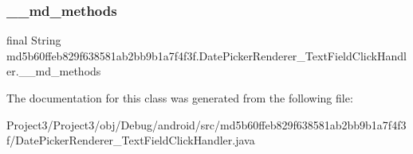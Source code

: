 \subsubsection{\texorpdfstring{\+\_\+\+\_\+md\+\_\+methods}{\_\_md\_methods}}
{\footnotesize\ttfamily final String md5b60ffeb829f638581ab2bb9b1a7f4f3f.\+Date\+Picker\+Renderer\+\_\+\+Text\+Field\+Click\+Handler.\+\_\+\+\_\+md\+\_\+methods\hspace{0.3cm}{\ttfamily [static]}}



The documentation for this class was generated from the following file\+:\begin{DoxyCompactItemize}
\item 
Project3/\+Project3/obj/\+Debug/android/src/md5b60ffeb829f638581ab2bb9b1a7f4f3f/Date\+Picker\+Renderer\+\_\+\+Text\+Field\+Click\+Handler.\+java\end{DoxyCompactItemize}
